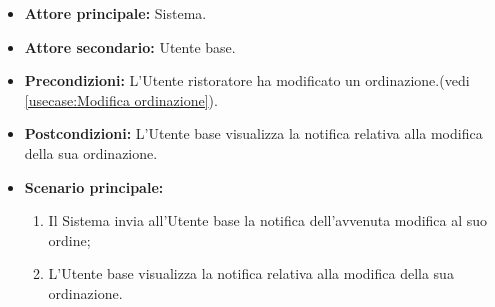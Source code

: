 \label{usecase:Visualizzazione notifica modifica ordinazione}
\begin{itemize}
	\item \textbf{Attore principale:} Sistema.

	\item \textbf{Attore secondario:} Utente base.

	\item \textbf{Precondizioni:} L'Utente ristoratore ha modificato un ordinazione.(vedi \autoref{usecase:Modifica ordinazione}).

	\item \textbf{Postcondizioni:} L'Utente base visualizza la notifica relativa alla modifica della sua ordinazione.

	\item \textbf{Scenario principale:}
	      \begin{enumerate}
		      \item Il Sistema invia all'Utente base la notifica dell'avvenuta modifica al suo ordine;

		      \item L'Utente base visualizza la notifica relativa alla modifica della sua ordinazione.
	      \end{enumerate}
\end{itemize}
